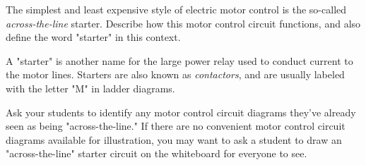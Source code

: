 

The simplest and least expensive style of electric motor control is the so-called {\it across-the-line} starter.  Describe how this motor control circuit functions, and also define the word "starter" in this context.







A "starter" is another name for the large power relay used to conduct current to the motor lines.  Starters are also known as {\it contactors}, and are usually labeled with the letter "M" in ladder diagrams.







Ask your students to identify any motor control circuit diagrams they've already seen as being "across-the-line."  If there are no convenient motor control circuit diagrams available for illustration, you may want to ask a student to draw an "across-the-line" starter circuit on the whiteboard for everyone to see.




